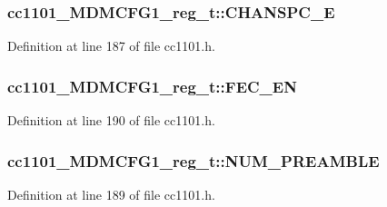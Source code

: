 \subsubsection[{\texorpdfstring{C\+H\+A\+N\+S\+P\+C\+\_\+E}{CHANSPC_E}}]{ cc1101\+\_\+\+M\+D\+M\+C\+F\+G1\+\_\+reg\+\_\+t\+::\+C\+H\+A\+N\+S\+P\+C\+\_\+E}\hypertarget{structcc1101___m_d_m_c_f_g1__reg__t_a9eb6464e035652c60cb477bee131f778}{}\label{structcc1101___m_d_m_c_f_g1__reg__t_a9eb6464e035652c60cb477bee131f778}


Definition at line 187 of file cc1101.\+h.

\subsubsection[{\texorpdfstring{F\+E\+C\+\_\+\+EN}{FEC_EN}}]{ cc1101\+\_\+\+M\+D\+M\+C\+F\+G1\+\_\+reg\+\_\+t\+::\+F\+E\+C\+\_\+\+EN}\hypertarget{structcc1101___m_d_m_c_f_g1__reg__t_abd75c28d96d4a1912d015453474f2553}{}\label{structcc1101___m_d_m_c_f_g1__reg__t_abd75c28d96d4a1912d015453474f2553}


Definition at line 190 of file cc1101.\+h.

\subsubsection[{\texorpdfstring{N\+U\+M\+\_\+\+P\+R\+E\+A\+M\+B\+LE}{NUM_PREAMBLE}}]{ cc1101\+\_\+\+M\+D\+M\+C\+F\+G1\+\_\+reg\+\_\+t\+::\+N\+U\+M\+\_\+\+P\+R\+E\+A\+M\+B\+LE}\hypertarget{structcc1101___m_d_m_c_f_g1__reg__t_a01b118e0865bf56f6e35977f2687564e}{}\label{structcc1101___m_d_m_c_f_g1__reg__t_a01b118e0865bf56f6e35977f2687564e}


Definition at line 189 of file cc1101.\+h.

